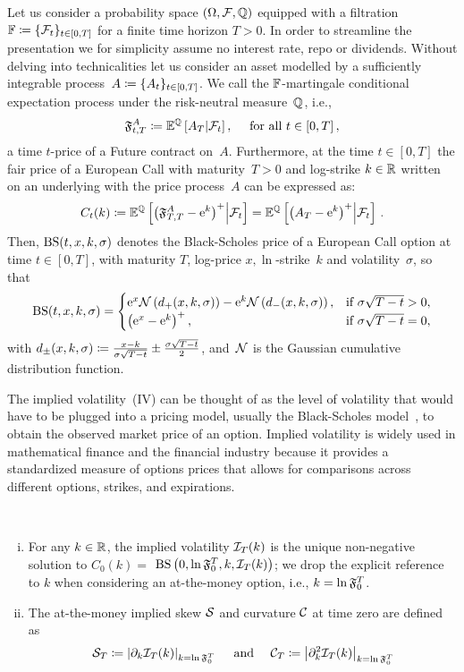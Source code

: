 Let us consider a probability space $(\Omega,\mathcal{F}, \mathbb{Q})$ equipped with a filtration $\mathbb{F}\coloneqq\{\mathcal{F}_t\}_{t\in[0,T]}$ for a finite time horizon $T>0$. In order to streamline the presentation we for simplicity assume no interest rate, repo or dividends. Without delving into technicalities let us consider an asset modelled by a sufficiently integrable process~$A\coloneqq \{A_t\}_{t\in[0, T]}$. We call the $\mathbb{F}$-martingale conditional expectation process under the risk-neutral measure~$\mathbb{Q}$, i.e.,
\[
\mathfrak{F}_{t,T}^A\coloneqq\mathbb{E}^{\mathbb{Q}}\left[A_T\middle\vert\mathcal{F}_t\right], \quad \text { for all } t \in [0,T]\,,
\]
a time $t$-price of a Future contract on~$A$. Furthermore, at the time $t\in[0, T]$ the fair price of a European Call with maturity~$T>0$ and log-strike $k\in \mathbb{R}$ written on an underlying with the price process~$A$ can be expressed as:
\[
C_t(k) \coloneqq \mathbb{E}^{\mathbb{Q}}\left[\left(\mathfrak{F}_{T,T}^A - \mathrm{e}^k\right)^+\middle\vert\mathcal{F}_t\right] = \mathbb{E}^{\mathbb{Q}}\left[\left(A_T - \mathrm{e}^k\right)^+\middle\vert\mathcal{F}_t\right]\,.
\]
Then, $\mathrm{BS}(t, x, k, \sigma)$ denotes the Black-Scholes price of a European Call option at time $t \in [0, T]$, with maturity $T$, log-price $x, \ln$-strike~$k$ and volatility~$\sigma$, so that
$$
\mathrm{BS}(t, x, k, \sigma)= \begin{cases}\mathrm{e}^x \mathcal{N}\left(d_{+}(x, k, \sigma)\right)-\mathrm{e}^k \mathcal{N}\left(d_{-}(x, k, \sigma)\right), & \text {if } \sigma \sqrt{T-t}>0, \\ \left(\mathrm{e}^x-\mathrm{e}^k\right)^{+}, & \text {if } \sigma \sqrt{T-t}=0,\end{cases}
$$
with $d_{\pm}(x, k, \sigma)\coloneqq\frac{x-k}{\sigma \sqrt{T-t}} \pm \frac{\sigma \sqrt{T-t}}{2}$, and~$\mathcal{N}$ is the Gaussian cumulative distribution function. 

The implied volatility~(IV) can be thought of as the level of volatility that would have to be plugged into a pricing model, usually the Black-Scholes model~\cite{Black1973TheLiabilities}, to obtain the observed market price of an option. Implied volatility is widely used in mathematical finance and the financial industry because it provides a standardized measure of options prices that allows for comparisons across different options, strikes, and expirations.
\begin{definition}\
\begin{enumerate}[i.]
    \item For any $k \in \mathbb{R}$, the implied volatility $\mathcal{I}_T(k)$ is the unique non-negative solution to $C_0(k)=$ $\mathrm{BS}\left(0, \ln\mathfrak{F}_0^T, k, \mathcal{I}_T(k)\right)$; we drop the explicit reference to $k$ when considering an at-the-money option, i.e., $k=\ln\mathfrak{F}_0^T$.
    \item The at-the-money implied skew $\mathcal{S}$ and curvature $\mathcal{C}$ at time zero are defined as
    $$
    \mathcal{S}_T\coloneqq\left|\partial_k \mathcal{I}_T(k)\right|_{k=\ln\mathfrak{F}_0^T} \quad \text { and } \quad \mathcal{C}_T\coloneqq\left|\partial_k^2 \mathcal{I}_T(k)\right|_{k=\ln\mathfrak{F}_0^T}
    $$
\end{enumerate}
\end{definition}

